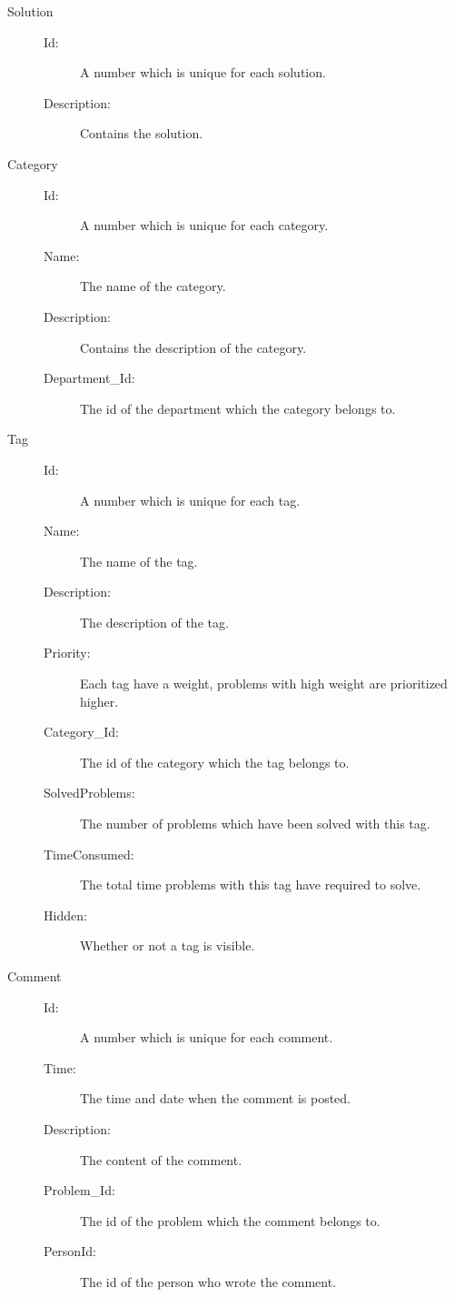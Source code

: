 \begin{description}
\item[Solution]\hfill
\begin{description}
\item[Id:] A number which is unique for each solution. 
\item[Description:] Contains the solution.
\end{description}
\end{description}

\begin{description}
\item[Category]\hfill
\begin{description}
\item[Id:] A number which is unique for each category. 
\item[Name:] The name of the category.
\item[Description:] Contains the description of the category.
\item[Department\_Id:] The id of the department which the category belongs to. 
\end{description}
\end{description}

\begin{description}
\item[Tag]\hfill
\begin{description}
\item[Id:] A number which is unique for each tag. 
\item[Name:] The name of the tag.
\item[Description:] The description of the tag.
\item[Priority:] Each tag have a weight, problems with high weight are prioritized higher.
\item[Category\_Id:] The id of the category which the tag belongs to. 
\item[SolvedProblems:] The number of problems which have been solved with this tag.
\item[TimeConsumed:] The total time problems with this tag have required to solve.
\item[Hidden:] Whether or not a tag is visible.
\end{description}
\end{description}

\begin{description}
\item[Comment]\hfill
\begin{description}
\item[Id:] A number which is unique for each comment. 
\item[Time:] The time and date when the comment is posted.  
\item[Description:] The content of the comment.
\item[Problem\_Id:] The id of the problem which the comment belongs to.
\item[PersonId:] The id of the person who wrote the comment.
\end{description}
\end{description}
